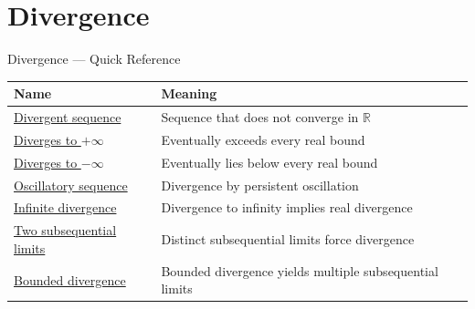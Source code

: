 \section{Divergence}

\begin{toolkitbox}{Divergence --- Quick Reference}
\small
\begin{tabular}{l l}
\toprule
\textbf{Name} & \textbf{Meaning} \\
\midrule
\hyperref[def:divergent-sequence]{Divergent sequence} & Sequence that does not converge in \(\mathbb{R}\) \\
\hyperref[def:diverges-to-positive-infinity]{Diverges to \(+\infty\)} & Eventually exceeds every real bound \\
\hyperref[def:diverges-to-negative-infinity]{Diverges to \(-\infty\)} & Eventually lies below every real bound \\
\hyperref[def:oscillatory-sequence]{Oscillatory sequence} & Divergence by persistent oscillation \\
\hyperref[thm:divergence-to-infinity-implies-real-divergence]{Infinite divergence} & Divergence to infinity implies real divergence \\
\hyperref[thm:two-subsequential-limits-force-divergence]{Two subsequential limits} & Distinct subsequential limits force divergence \\
\hyperref[thm:bounded-divergence-produces-two-subsequential-limits]{Bounded divergence} & Bounded divergence yields multiple subsequential limits \\
\bottomrule
\end{tabular}
\end{toolkitbox}


